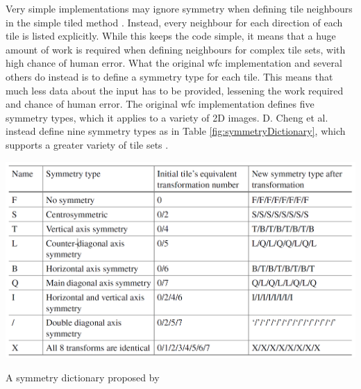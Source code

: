 Very simple implementations may ignore symmetry when defining tile neighbours in the simple tiled method \cite{Easy_WFC}. Instead, every neighbour for each direction of each tile is listed explicitly. While this keeps the code simple, it means that a huge amount of work is required when defining neighbours for complex tile sets, with high chance of human error. What the original \acrshort{wfc} implementation and several others do instead is to define a symmetry type for each tile. This means that much less data about the input has to be provided, lessening the work required and chance of human error. The original \acrshort{wfc} implementation defines five symmetry types, which it applies to a variety of 2D images. D. Cheng et al. instead define nine symmetry types as in Table \ref{fig:symmetryDictionary}, which supports a greater variety of tile sets \cite{WFC_Automatic_Rules_And_Better_Symmetries}.

\begin{table}[H]
    \centering
    \includegraphics[width=\textwidth, height=0.3\textheight, keepaspectratio]{Images/SymmetryDictionary.png}
    \caption{A symmetry dictionary proposed by \cite{WFC_Automatic_Rules_And_Better_Symmetries}}
    \label{fig:symmetryDictionary}
\end{table}

